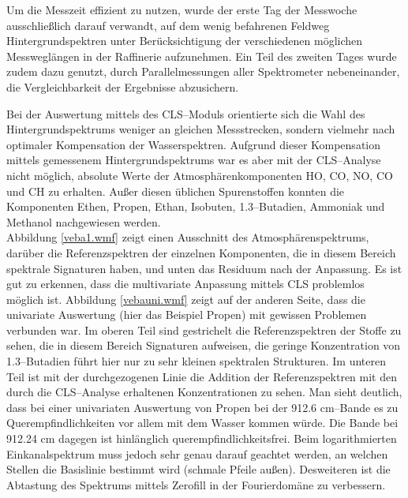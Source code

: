 Um die Messzeit effizient zu nutzen, wurde der erste Tag der
Messwoche ausschließlich darauf verwandt, auf dem wenig befahrenen
Feldweg Hintergrundspektren unter Berücksichtigung der
verschiedenen möglichen Messweglängen in der Raffinerie
aufzunehmen. Ein Teil des zweiten Tages wurde zudem dazu genutzt,
durch Parallelmessungen aller Spektrometer nebeneinander, die
Vergleichbarkeit der Ergebnisse abzusichern.\\



Bei der Auswertung mittels des CLS--Moduls orientierte sich die
Wahl des Hintergrundspektrums weniger an gleichen Messstrecken,
sondern vielmehr nach optimaler Kompensation der Wasserspektren.
Aufgrund dieser Kompensation mittels gemessenem
Hintergrundspektrums war es aber mit der CLS--Analyse nicht
möglich, absolute Werte der Atmosphärenkomponenten HO,
CO, NO, CO und CH zu erhalten. Außer
diesen üblichen Spurenstoffen konnten die Komponenten Ethen,
Propen, Ethan, Isobuten, 1.3--Butadien, Ammoniak und Methanol
nachgewiesen werden.\\

Abbildung \ref{veba1.wmf} zeigt einen Ausschnitt des
Atmosphärenspektrums, darüber die Referenzspektren der einzelnen
Komponenten, die in diesem Bereich spektrale Signaturen haben, und
unten das Residuum nach der Anpassung. Es ist gut zu erkennen,
dass die multivariate Anpassung mittels CLS problemlos möglich
ist. Abbildung \ref{vebauni.wmf} zeigt auf der anderen Seite, dass
die univariate Auswertung (hier das Beispiel Propen) mit gewissen
Problemen verbunden war. Im oberen Teil sind gestrichelt die
Referenzspektren der Stoffe zu sehen, die in diesem Bereich
Signaturen aufweisen, die geringe Konzentration von 1.3--Butadien
führt hier nur zu sehr kleinen spektralen Strukturen. Im unteren
Teil ist mit der durchgezogenen Linie die Addition der
Referenzspektren mit den durch die CLS--Analyse erhaltenen
Konzentrationen zu sehen. Man sieht deutlich, dass bei einer
univariaten Auswertung von Propen bei der 912.6 cm--Bande
es zu Querempfindlichkeiten vor allem mit dem Wasser kommen würde.
Die Bande bei 912.24 cm dagegen ist hinlänglich
querempfindlichkeitsfrei. Beim logarithmierten Einkanalspektrum
muss jedoch sehr genau darauf geachtet werden, an welchen Stellen
die Basislinie bestimmt wird (schmale Pfeile außen). Desweiteren
ist die Abtastung des Spektrums mittels Zerofill in der
Fourierdomäne zu verbessern.\\

